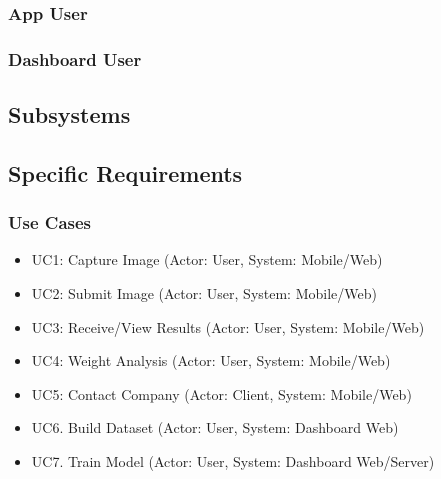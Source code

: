 \documentclass[a4paper, 11pt]{article}
\begin{document}
\subsubsection{App User}

\subsubsection{Dashboard User}


\subsection{Subsystems}

\subsection{Specific Requirements}
\subsubsection{Use Cases}
    \begin{itemize}
        \item UC1: Capture Image (Actor: User, System: Mobile/Web)
        \item UC2: Submit Image (Actor: User, System: Mobile/Web)
        \item UC3: Receive/View Results (Actor: User, System: Mobile/Web)
        \item UC4: Weight Analysis (Actor: User, System: Mobile/Web)
        \item UC5: Contact Company (Actor: Client, System: Mobile/Web)
        \item UC6. Build Dataset (Actor: User, System: Dashboard Web)
        \item UC7. Train Model (Actor: User, System: Dashboard Web/Server)
    \end{itemize}
\end{document}
